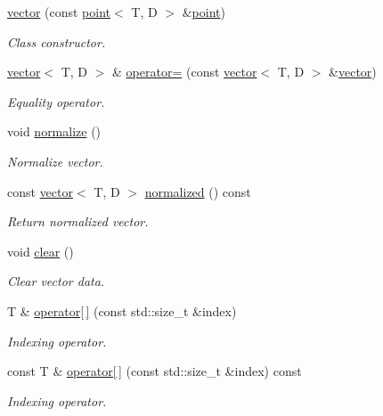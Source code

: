 \begin{DoxyCompactItemize}
\hyperlink{classacme_1_1vector_a9905548953583e0a1ef3929c4e609f8e}{vector} (const \hyperlink{classacme_1_1point}{point}$<$ T, D $>$ \&\hyperlink{classacme_1_1point}{point})
\begin{DoxyCompactList}\small\item\em Class constructor. \end{DoxyCompactList}\item 
\hyperlink{classacme_1_1vector}{vector}$<$ T, D $>$ \& \hyperlink{classacme_1_1vector_a9bf3091c36ef771c02a22e5aae144952}{operator=} (const \hyperlink{classacme_1_1vector}{vector}$<$ T, D $>$ \&\hyperlink{classacme_1_1vector}{vector})
\begin{DoxyCompactList}\small\item\em Equality operator. \end{DoxyCompactList}\item 
\mbox{\label{classacme_1_1vector_ae8e43db3ab2dea42390d713254bb0684}} 
void \hyperlink{classacme_1_1vector_ae8e43db3ab2dea42390d713254bb0684}{normalize} ()
\begin{DoxyCompactList}\small\item\em Normalize vector. \end{DoxyCompactList}\item 
\mbox{\label{classacme_1_1vector_a067e26aadf2e8ea910a1e7b3365892cd}} 
const \hyperlink{classacme_1_1vector}{vector}$<$ T, D $>$ \hyperlink{classacme_1_1vector_a067e26aadf2e8ea910a1e7b3365892cd}{normalized} () const
\begin{DoxyCompactList}\small\item\em Return normalized vector. \end{DoxyCompactList}\item 
\mbox{\label{classacme_1_1point_a72a37be7ec9417b12eeec1a31ed0398b}} 
void \hyperlink{classacme_1_1point_a72a37be7ec9417b12eeec1a31ed0398b}{clear} ()
\begin{DoxyCompactList}\small\item\em Clear vector data. \end{DoxyCompactList}\item 
T \& \hyperlink{classacme_1_1point_ac8fee17f41cb01f10ecb082921018155}{operator\mbox{[}$\,$\mbox{]}} (const std\+::size\+\_\+t \&index)
\begin{DoxyCompactList}\small\item\em Indexing operator. \end{DoxyCompactList}\item 
const T \& \hyperlink{classacme_1_1point_a5e3a5ca9538fcdb337127d27fcecc2b6}{operator\mbox{[}$\,$\mbox{]}} (const std\+::size\+\_\+t \&index) const
\begin{DoxyCompactList}\small\item\em Indexing operator. \end{DoxyCompactList}\end{DoxyCompactItemize}
